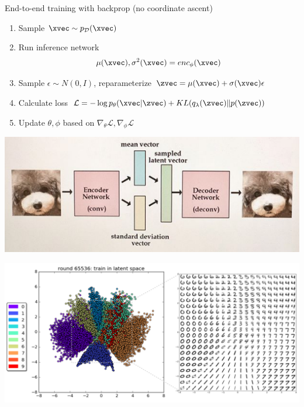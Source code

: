 \begin{frame}
  \begin{center}
   \end{center}
End-to-end training with backprop (no coordinate ascent)
\begin{enumerate}
\item Sample $\xvec \sim p_\mathcal{D}(\xvec)$
\item Run inference network 
\[ \mu(\xvec),  \sigma^2(\xvec) = enc_\phi(\xvec)\]
\item Sample $\epsilon \sim N(0, I)$, reparameterize $\zvec = \mu(\xvec) + \sigma (\xvec) \epsilon $
\item Calculate loss $\mathcal{L} = - \log p_\theta(\xvec | \zvec) + KL(q_\lambda(\zvec) \Vert p(\zvec))$
\item Update $\theta, \phi$ based on $\nabla_\theta \mathcal{L}, \nabla_\phi \mathcal{L} $
\end{enumerate}
\end{frame}

\begin{frame}
  \begin{center}
   \end{center}
   \center
   \includegraphics[scale=0.5]{vae-ara}
\end{frame}


\begin{frame}
  \begin{center}
   \end{center}
   \center
   \includegraphics[scale=0.5]{vae2}
\end{frame}

